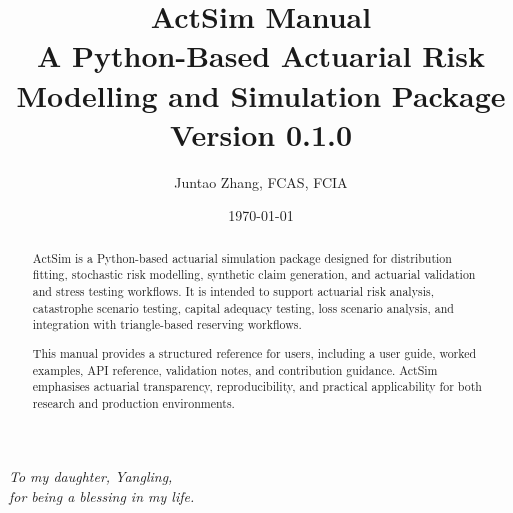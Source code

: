 \documentclass[11pt,letterpaper]{report}
\title{
    \vspace{-2cm}
    \Huge\textbf{ActSim Manual}\\[0.5em]
    \large A Python-Based Actuarial Risk Modelling and Simulation Package\\[0.3em]
    \normalsize Version 0.1.0
}
\author{Juntao Zhang, FCAS, FCIA}
\date{\today}
\begin{document}
\maketitle

\clearpage
\thispagestyle{empty}
\vspace*{\fill}
\begin{center}
\textit{To my daughter, Yangling,\\ for being a blessing in my life.}
\end{center}
\vspace*{\fill}
\clearpage

\begin{abstract}
\noindent ActSim is a Python-based actuarial simulation package designed for
distribution fitting, stochastic risk modelling, synthetic claim generation, and
actuarial validation and stress testing workflows. It is intended to support actuarial 
risk analysis, catastrophe scenario testing, capital adequacy testing, loss 
scenario analysis, and integration with triangle-based reserving workflows.

\noindent This manual provides a structured reference for users, including a
user guide, worked examples, API reference, validation notes, and contribution
guidance. ActSim emphasises actuarial transparency, reproducibility, and
practical applicability for both research and production environments.
\end{abstract}

\tableofcontents
\clearpage


















\end{document}
